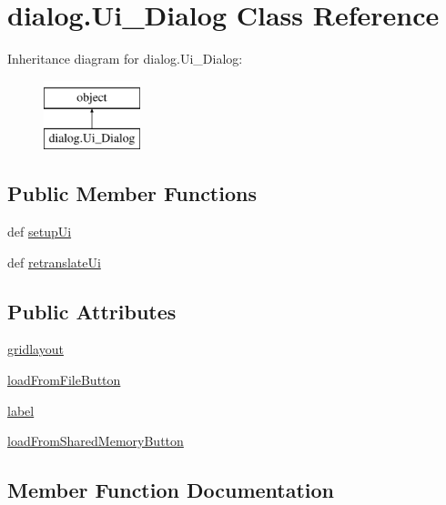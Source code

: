 \hypertarget{classdialog_1_1Ui__Dialog}{}\section{dialog.\+Ui\+\_\+\+Dialog Class Reference}
\label{classdialog_1_1Ui__Dialog}
Inheritance diagram for dialog.\+Ui\+\_\+\+Dialog\+:\begin{figure}[H]
\begin{center}
\leavevmode
\includegraphics[height=2.000000cm]{classdialog_1_1Ui__Dialog}
\end{center}
\end{figure}
\subsection*{Public Member Functions}
\begin{DoxyCompactItemize}
\item 
def \hyperlink{classdialog_1_1Ui__Dialog_ac6c496b4f5fe7753751ae1c1ecb75a84}{setup\+Ui}
\item 
def \hyperlink{classdialog_1_1Ui__Dialog_aa54f629be0f44001d8051995b551cc71}{retranslate\+Ui}
\end{DoxyCompactItemize}
\subsection*{Public Attributes}
\begin{DoxyCompactItemize}
\item 
\hyperlink{classdialog_1_1Ui__Dialog_a52eaf32d40311e26e2c405480b9ff7ca}{gridlayout}
\item 
\hyperlink{classdialog_1_1Ui__Dialog_ab17db14533830678b54e0964912875e3}{load\+From\+File\+Button}
\item 
\hyperlink{classdialog_1_1Ui__Dialog_a9391bd9c313dfbc0a0fb2055edfa2ca6}{label}
\item 
\hyperlink{classdialog_1_1Ui__Dialog_a470d25b24e820d2a93cba2bb474c2299}{load\+From\+Shared\+Memory\+Button}
\end{DoxyCompactItemize}


\subsection{Member Function Documentation}
\hypertarget{classdialog_1_1Ui__Dialog_aa54f629be0f44001d8051995b551cc71}{}
